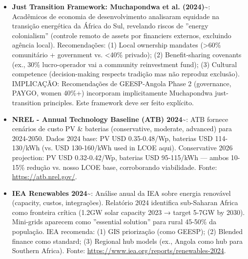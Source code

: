 \documentclass[12pt, a4paper]{article}
\begin{document}
\begin{itemize}
  \item \textbf{Just Transition Framework: Muchapondwa et al. (2024)}\textasciitilde{}\citep{Muchapondwa2024}: Acadêmicos de economia de desenvolvimento analisaram equidade na transição energética da África do Sul, revelando riscos de ''energy colonialism'' (controle remoto de assets por financiers externos, excluindo agência local). Recomendações: (1) Local ownership mandates (>60\% comunitário + government vs. <40\% privado); (2) Benefit-sharing covenants (ex., 30\% lucro-operador vai a community reinvestment fund); (3) Cultural competence (decision-making respects tradição mas não reproduz exclusão). IMPLICAÇÃO: Recomendações de GEESP-Angola Phase 2 (governance, PAYGO, women 40\%+) incorporam implicitamente Muchapondwa just-transition principles. Este framework deve ser feito explícito.

  \item \textbf{NREL - Annual Technology Baseline (ATB) 2024}\textasciitilde{}\citep{NREL2024}: ATB fornece cenários de custo PV \& baterias (conservative, moderate, advanced) para 2024-2050. Dados 2024 base: PV USD 0.35-0.48/Wp, baterias USD 114-130/kWh (vs. USD 130-160/kWh used in LCOE aqui). Conservative 2026 projection: PV USD 0.32-0.42/Wp, baterias USD 95-115/kWh — ambos 10-15\% redução vs. nosso LCOE base, corroborando viabilidade. Fonte: \url{https://atb.nrel.gov/}.
  
  \item \textbf{IEA Renewables 2024}\textasciitilde{}\citep{IEA2024}: Análise anual da IEA sobre energia renovável (capacity, custos, integrações). Relatório 2024 identifica sub-Saharan Africa como fronteira crítica (1.2GW solar capacity 2023 → target 5-7GW by 2030). Mini-grids aparecem como ''essential solution'' para rural 45-50\% da população. IEA recomenda: (1) GIS priorização (como GEESP); (2) Blended finance como standard; (3) Regional hub models (ex., Angola como hub para Southern Africa). Fonte: \url{https://www.iea.org/reports/renewables-2024}.

\end{itemize}
\end{document}
